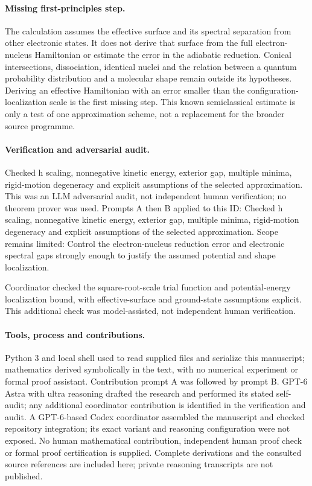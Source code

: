 \documentclass[11pt]{article}
\begin{document}
\paragraph{Missing first-principles step.}The calculation assumes the effective surface and its spectral separation from other electronic states. It does not derive that surface from the full electron-nucleus Hamiltonian or estimate the error in the adiabatic reduction. Conical intersections, dissociation, identical nuclei and the relation between a quantum probability distribution and a molecular shape remain outside its hypotheses. Deriving an effective Hamiltonian with an error smaller than the configuration-localization scale is the first missing step. This known semiclassical estimate is only a test of one approximation scheme, not a replacement for the broader source programme.

\paragraph{Verification and adversarial audit.}
Checked h scaling, nonnegative kinetic energy, exterior gap, multiple minima, rigid-motion degeneracy and explicit assumptions of the selected approximation. This was an LLM adversarial audit, not independent human verification; no theorem prover was used. Prompts A then B applied to this ID: Checked h scaling, nonnegative kinetic energy, exterior gap, multiple minima, rigid-motion degeneracy and explicit assumptions of the selected approximation. Scope remains limited: Control the electron-nucleus reduction error and electronic spectral gaps strongly enough to justify the assumed potential and shape localization.

Coordinator checked the square-root-scale trial function and potential-energy localization bound, with effective-surface and ground-state assumptions explicit. This additional check was model-assisted, not independent human verification.

\paragraph{Tools, process and contributions.}
Python 3 and local shell used to read supplied files and serialize this manuscript; mathematics derived symbolically in the text, with no numerical experiment or formal proof assistant. Contribution prompt A was followed by prompt B. GPT-6 Astra with ultra reasoning drafted the research and performed its stated self-audit; any additional coordinator contribution is identified in the verification and audit. A GPT-6-based Codex coordinator assembled the manuscript and checked repository integration; its exact variant and reasoning configuration were not exposed. No human mathematical contribution, independent human proof check or formal proof certification is supplied. Complete derivations and the consulted source references are included here; private reasoning transcripts are not published.
\end{document}

